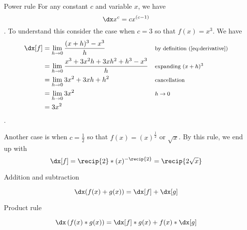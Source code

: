 \begin{psec}{Power rule}\label{rule:derivative powers} For any constant $c$ and
    variable $x$, we have
    \begin{equation}\label{eq:derivative power}
        \dx x^c = c x^{(c - 1)}
    \end{equation}
    . To understand this consider the case when $c=3$ so that $f(x) = x^3$. We have 
    \begin{align*}
        \dx[f] &= \lim_{h\rightarrow 0} \frac{(x + h)^3 - x^3}{h} & &
        \text{\footnotesize by definition (\ref{eq:derivative})}\\
               &= \lim_{h\rightarrow 0} \frac{x^3 +3x^2h + 3xh^2 + h^3 -
               x^3}{h} & & \text{\footnotesize expanding $(x + h)^3$}\\
               &= \lim_{h\rightarrow 0} 3x^2 + 3xh + h^2 & &
               \text{\footnotesize cancellation}\\
               &= \lim_{h\rightarrow 0} 3x^2 & & \text{\footnotesize $h\rightarrow 0$} \\
               &= 3x^2 & \text{}
    \end{align*}.
    
    Another case is when $c = \frac{1}{2}$ so that $f(x) = (x)^{\frac{1}{2}}$ or
    $\sqrt{x}$. By this rule, we end up with 
    \begin{equation*}
        \dx[f] = \recip{2} * (x)^{-\recip{2}} = \recip{2\sqrt{x}}
    \end{equation*}

\end{psec}

\begin{psec}{Addition and subtraction}\label{rule:derivative add}

    \begin{equation}\label{eq:derivative add}
        \dx (f(x) + g(x)) = \dx[f] + \dx[g]
    \end{equation}

\end{psec}

\begin{psec}{Product rule}\label{rule:derivative product}

    \begin{equation}\label{eq:derivative prod}
        \dx \left(f(x)*g(x)\right) = \dx[f] *  g(x) + f(x) *
        \dx[g]
    \end{equation}

\end{psec}

